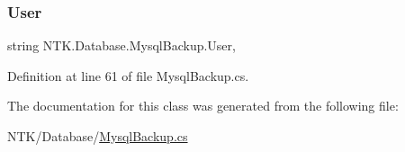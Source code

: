 \subsubsection{\texorpdfstring{User}{User}}
{\footnotesize\ttfamily string N\+T\+K.\+Database.\+Mysql\+Backup.\+User\hspace{0.3cm}{\ttfamily [get]}, {\ttfamily [set]}}



Definition at line 61 of file Mysql\+Backup.\+cs.



The documentation for this class was generated from the following file\+:\begin{DoxyCompactItemize}
\item 
N\+T\+K/\+Database/\mbox{\hyperlink{_mysql_backup_8cs}{Mysql\+Backup.\+cs}}\end{DoxyCompactItemize}
